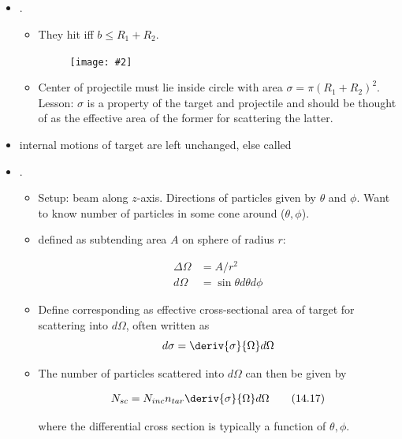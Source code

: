 \documentclass[10pt, twocolumn]{article}
\DeclareRobustCommand{\mybox}[2][gray!20]{%
	\begin{tcolorbox}[   %
		breakable,
		left=0pt,
		right=0pt,
		top=-13pt,
		bottom=0pt,
		colback=#1,
		colframe=#1,
		width=0.45\dimexpr\textwidth\relax,
		enlarge left by=0mm,
		boxsep=1pt,
		arc=0pt,outer arc=0pt,
		]
		#2
	\end{tcolorbox}
}
\newcommand\graybox[1]{ \mybox[gray!20]{\begin{align}#1\end{align}} }
\newcommand\myfig[2][0.3\textwidth]{\begin{figure}[h!]\centering\texttt{[image: \#2]}\end{figure}}
\newcommand\tlab[1]{\tag{#1}\label{#1}}
\begin{document}
\subsection{}
\begin{itemize}
	\item {}. 
	\begin{itemize}
		\item They hit iff $b \le R_1 + R_2$. 	\myfig{sphere_scatter.PNG}
		\item Center of projectile must lie inside circle with area $\sigma = \pi (R_1 + R_2)^2$. Lesson: $\sigma$ is a property of the target and projectile and should be thought of as the effective area
		of the former for scattering the latter. 
	\end{itemize}
	
	\item {} internal motions of target are left unchanged, else called 
	
	\item {}. 
	\begin{itemize}
		\item Setup: beam along $z$-axis. Directions of particles given by $\theta$ and $\phi$. Want to know number of particles in some cone around ($\theta, \phi$). 
		\item {} defined as subtending area $A$ on sphere of radius $r$:
		\graybox{\Delta\Omega &= A/r^2 \tlab{14.14} \\ d\Omega &= \sin\theta d\theta d\phi \tlab{14.15}}
	
		
		\item Define corresponding  as effective cross-sectional area of target for scattering into $d\Omega$, often written as \[
		d\sigma = \deriv{\sigma}{\Omega} d\Omega
		\]
		
		\item The number of particles scattered into $d\Omega$ can then be given by 
		\graybox{N_{sc} = N_{inc}n_{tar} \deriv{\sigma}{\Omega} d\Omega \tlab{14.17}}
		where the differential cross section is typically a function of $\theta ,\phi$. 
	\end{itemize}
\end{itemize}

	
\end{document}
